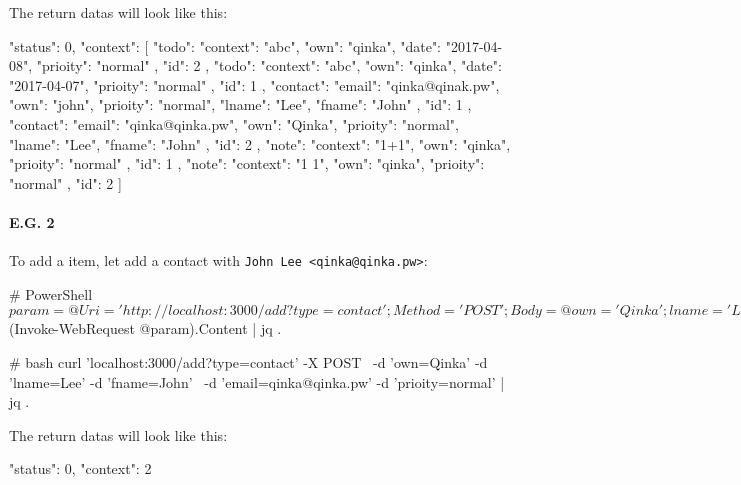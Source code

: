\documentclass{article}
\begin{document}
  The return datas will look like this:
  \begin{json}
{
    "status": 0,
    "context": [
    {
        "todo": {
            "context": "abc",
            "own": "qinka",
            "date": "2017-04-08",
            "prioity": "normal"
        },
        "id": 2
    },
    {
        "todo": {
            "context": "abc",
            "own": "qinka",
            "date": "2017-04-07",
            "prioity": "normal"
        },
        "id": 1
    },
    {
        "contact": {
            "email": "qinka@qinak.pw",
            "own": "john",
            "prioity": "normal",
            "lname": "Lee",
            "fname": "John"
        },
        "id": 1
    },
    {
        "contact": {
            "email": "qinka@qinka.pw",
            "own": "Qinka",
            "prioity": "normal",
            "lname": "Lee",
            "fname": "John"
        },
        "id": 2
    },
    {
        "note": {
            "context": "1+1",
            "own": "qinka",
            "prioity": "normal"
        },
        "id": 1
    },
    {
        "note": {
            "context": "1 1",
            "own": "qinka",
            "prioity": "normal"
        },
        "id": 2
    }
    ]
}
  \end{json}
  
  \paragraph{E.G. 2}
  
  To add a item, let add a contact with \verb|John Lee <qinka@qinka.pw>|:
  \begin{powershell}
 # PowerShell
 $param = @{ Uri = 'http://localhost:3000/add?type=contact';
             Method = 'POST';
             Body = @{ own = 'Qinka';
                       lname = 'Lee';
                       fname = 'John';
                       email = 'qinka@qinka.pw';
                       prioity = 'normal'
                     }
           }
 $(Invoke-WebRequest @param).Content | jq .
  \end{powershell}
  \begin{bash}
 # bash
 curl 'localhost:3000/add?type=contact' -X POST \
   -d 'own=Qinka' -d 'lname=Lee' -d 'fname=John' \
   -d 'email=qinka@qinka.pw' -d 'prioity=normal' | jq .
  \end{bash}
  
  The return datas will look like this:
  \begin{json}
 {
     "status": 0,
     "context": 2
 }
  \end{json}
  
\end{document}
